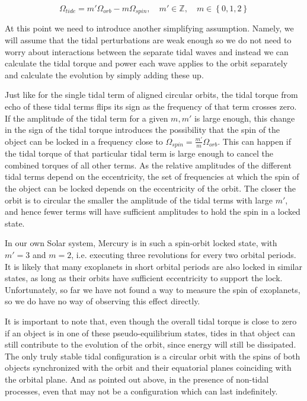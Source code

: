 \begin{equation}
%
    \Omega_{tide} = m' \Omega_{orb} - m \Omega_{spin},
%
    \quad m' \in \mathbb{Z},\quad m \in \left\{0, 1, 2\right\}
%
\end{equation}

At this point we need to introduce another simplifying assumption. Namely, we
will assume that the tidal perturbations are weak enough so we do not need to
worry about interactions between the separate tidal waves and instead we can
calculate the tidal torque and power each wave applies to the orbit separately
and calculate the evolution by simply adding these up.

Just like for the single tidal term of aligned circular orbits, the tidal torque
from echo of these tidal terms flips its sign as the frequency of that term
crosses zero. If the amplitude of the tidal term for a given $m,m'$ is large
enough, this change in the sign of the tidal torque introduces the
possibility that the spin of the object can be locked in a frequency close to
$\Omega_{spin}=\frac{m'}{m} \Omega_{orb}$. This can happen if the tidal torque
of that particular tidal term is large enough to cancel the combined torques of
all other terms. As the relative amplitudes of the different tidal terms depend
on the eccentricity, the set of frequencies at which the spin of the object can
be locked depends on the eccentricity of the orbit. The closer the orbit is to
circular the smaller the amplitude of the tidal terms with large $m'$, and hence
fewer terms will have sufficient amplitudes to hold the spin in a locked state.

In our own Solar system, Mercury is in such a spin-orbit locked state, with
$m'=3$ and $m=2$, i.e. executing three revolutions for every two orbital
periods. It is likely that many exoplanets in short orbital periods are also
locked in similar states, as long as their orbits have sufficient eccentricity
to support the lock. Unfortunately, so far we have not found a way to measure
the spin of exoplanets, so we do have no way of observing this effect directly.

It is important to note that, even though the overall tidal torque is close to
zero if an object is in one of these pseudo-equilibrium states, tides in that
object can still contribute to the evolution of the orbit, since energy will
still be dissipated. The only truly stable tidal configuration is a circular
orbit with the spins of both objects synchronized with the orbit and their
equatorial planes coinciding with the orbital plane. And as pointed out above,
in the presence of non-tidal processes, even that may not be a configuration
which can last indefinitely.
